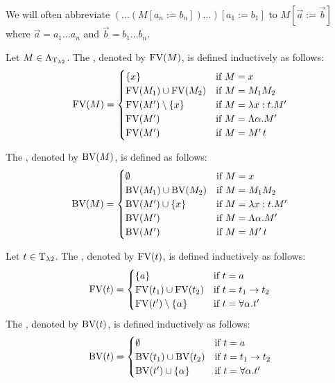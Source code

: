 We will often abbreviate $(\dots(M\left[a_n:=b_n\right])\dots)\left[a_1:=b_1\right]$ to $M\left[\vec{a}:=\vec{b}\right]$ where $\vec{a}=a_1\dots a_n$ and $\vec{b}=b_1\dots b_n$.

\begin{definition}\label{def.2.3}
	Let $M\in\Lambda_{\text{T}_{\lambda2}}$. The , denoted by $\text{FV}(M)$, is defined inductively as follows:
	\[\text{FV}(M)=
		\begin{cases}
			\{x\}                 & \text{if $M=x$}                \\
			\text{FV}(M_1)\cup\text{FV}(M_2)  & \text{if $M=M_1M_2$}           \\
			\text{FV}(M')\setminus\{x\} & \text{if $M=\lambda x:t.M'$}   \\
			\text{FV}(M')               & \text{if $M=\Lambda\alpha.M'$} \\
			\text{FV}(M')               & \text{if $M=M'\,t$}            \\
		\end{cases}\]
			
	The , denoted by $\text{BV}(M)$, is defined as follows:
	\[\text{BV}(M)=
		\begin{cases}
			\emptyset             & \text{if $M=x$}                \\ 
			\text{BV}(M_1)\cup\text{BV}(M_2)  & \text{if $M=M_1M_2$}           \\
			\text{BV}(M')\cup\{x\}      & \text{if $M=\lambda x:t.M'$}   \\
			\text{BV}(M')               & \text{if $M=\Lambda\alpha.M'$} \\
			\text{BV}(M')               & \text{if $M=M'\,t$}            \\
		\end{cases}\]
\end{definition}

\begin{definition}\label{def.2.4}
	Let $t\in\text{T}_{\lambda2}$. The , denoted by $\text{FV}(t)$, is defined inductively as follows:
	\[\text{FV}(t)=
		\begin{cases}
			\{a\}                 & \text{if $t=a$}                    \\ 
			\text{FV}(t_1)\cup\text{FV}(t_2)  & \text{if $t=t_1\to t_2$}           \\
			\text{FV}(t')\setminus\{\alpha\} & \text{if $t=\forall\alpha.t'$}\\
		\end{cases}\]
	The , denoted by $\text{BV}(t)$, is defined inductively as follows:
	\[\text{BV}(t)=
		\begin{cases}
			\emptyset              & \text{if $t=a$}                    \\ 
			\text{BV}(t_1)\cup\text{BV}(t_2)  & \text{if $t=t_1\to t_2$}           \\
			\text{BV}(t')\cup\{\alpha\} & \text{if $t=\forall\alpha.t'$}
		\end{cases}\]	
\end{definition}

